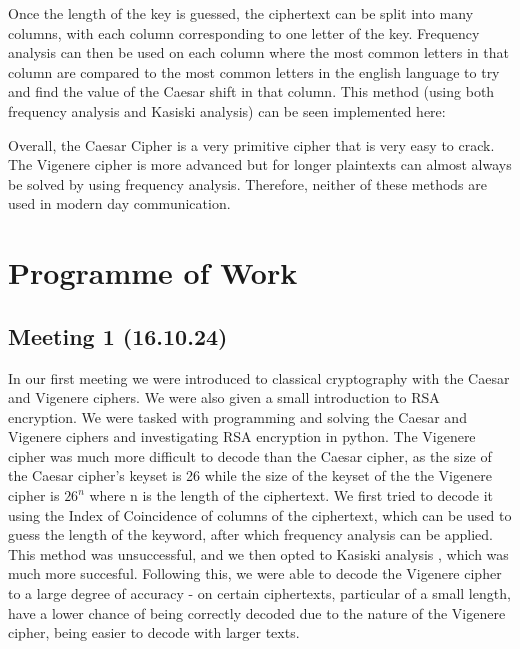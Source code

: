 \documentclass{article}
\begin{document}
Once the length of the key is guessed, the ciphertext can be split into many columns, with each column corresponding to one letter of the key. Frequency analysis can then  be used on each column where the most common letters in that column are compared to the most common letters in the english language to try and find the value of the Caesar shift in that column. This method (using both frequency analysis and Kasiski analysis) can be seen implemented here:\medskip

Overall, the Caesar Cipher is a very primitive cipher that is very easy to crack. The Vigenere cipher is more advanced but for longer plaintexts can almost always be solved by using frequency analysis. Therefore, neither of these methods are used in modern day communication.

\section{Programme of Work}
\subsection{Meeting 1 (16.10.24)}
In our first meeting we were introduced to classical cryptography with the Caesar and Vigenere ciphers. We were also given a small introduction to RSA encryption. We were tasked with programming and solving the Caesar and Vigenere ciphers and investigating RSA encryption in python. The Vigenere cipher was much more difficult to decode than the Caesar cipher, as the size of the Caesar cipher's keyset is 26 while the size of the keyset of the the Vigenere cipher is $ 26^n $ where n is the length of the ciphertext. We first tried to decode it using the Index of Coincidence \cite{ioc} of columns of the ciphertext, which can be used to guess the length of the keyword, after which frequency analysis can be applied. This method was unsuccessful, and we then opted to Kasiski analysis \cite{kasiski}, which was much more succesful. Following this, we were able to decode the Vigenere cipher to a large degree of accuracy - on certain ciphertexts, particular of a small length, have a lower chance of being correctly decoded due to the nature of the Vigenere cipher, being easier to decode with larger texts.
\end{document}
